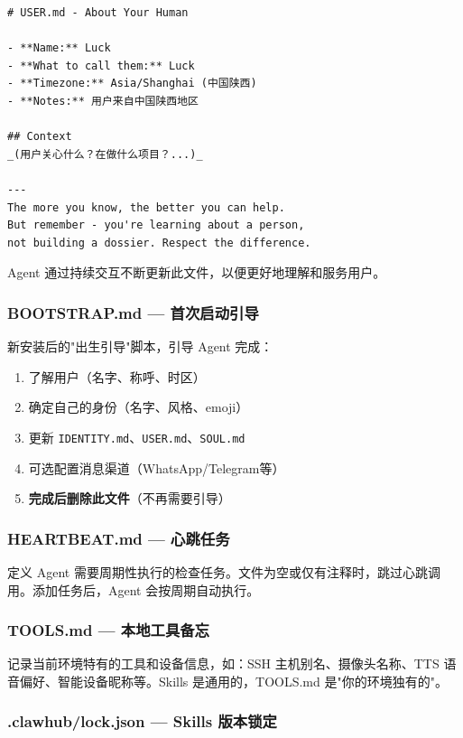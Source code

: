 \begin{lstlisting}
# USER.md - About Your Human

- **Name:** Luck
- **What to call them:** Luck
- **Timezone:** Asia/Shanghai (中国陕西)
- **Notes:** 用户来自中国陕西地区

## Context
_(用户关心什么？在做什么项目？...)_

---
The more you know, the better you can help.
But remember - you're learning about a person,
not building a dossier. Respect the difference.
\end{lstlisting}

Agent 通过持续交互不断更新此文件，以便更好地理解和服务用户。

\subsubsection{BOOTSTRAP.md --- 首次启动引导}


新安装后的"出生引导"脚本，引导 Agent 完成：

\begin{enumerate}
  \item 了解用户（名字、称呼、时区）
  \item 确定自己的身份（名字、风格、emoji）
  \item 更新 \texttt{IDENTITY.md}、\texttt{USER.md}、\texttt{SOUL.md}
  \item 可选配置消息渠道（WhatsApp/Telegram等）
  \item \textbf{完成后删除此文件}（不再需要引导）
\end{enumerate}

\subsubsection{HEARTBEAT.md --- 心跳任务}


定义 Agent 需要周期性执行的检查任务。文件为空或仅有注释时，跳过心跳调用。添加任务后，Agent 会按周期自动执行。

\subsubsection{TOOLS.md --- 本地工具备忘}


记录当前环境特有的工具和设备信息，如：SSH 主机别名、摄像头名称、TTS 语音偏好、智能设备昵称等。Skills 是通用的，TOOLS.md 是"你的环境独有的"。

\subsubsection{.clawhub/lock.json --- Skills 版本锁定}


